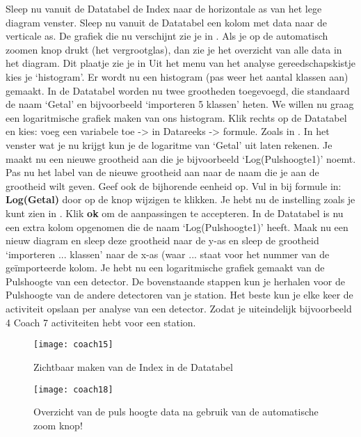 Sleep nu vanuit de Datatabel de Index naar de horizontale as van het lege diagram venster.
Sleep nu vanuit de Datatabel een kolom met data naar de verticale as.
De grafiek die nu verschijnt zie je in . Als je op de automatisch
zoomen knop drukt (het vergrootglas), dan zie je het overzicht van alle data in het
diagram. Dit plaatje zie je in 
Uit het menu van het analyse gereedschapskistje kies je `histogram'. Er wordt
nu een histogram (pas weer het aantal klassen aan) gemaakt. In de Datatabel worden
nu twee grootheden toegevoegd, die standaard de naam `Getal' en bijvoorbeeld
`importeren 5 klassen' heten.
We willen nu graag een logaritmische grafiek maken van ons histogram.
Klik rechts op de Datatabel en kies: voeg een variabele toe -> in Datareeks -> formule.
Zoals in . In het venster wat je nu krijgt kun je de logaritme
van `Getal' uit laten rekenen. Je maakt nu een nieuwe grootheid aan die je
bijvoorbeeld `Log(Pulshoogte1)' noemt.
Pas nu het label van de nieuwe grootheid aan naar de naam die je aan de grootheid
wilt geven. Geef ook de bijhorende eenheid op. Vul in bij formule in:
\textbf{Log(Getal)} door op de knop wijzigen te klikken. Je hebt nu de instelling
zoals je kunt zien in .
Klik \textbf{ok} om de aanpassingen te accepteren. In de Datatabel is nu een extra kolom opgenomen
die de naam `Log(Pulshoogte1)' heeft.
Maak nu een nieuw diagram en sleep deze grootheid naar de y-as en sleep de grootheid
`importeren ... klassen' naar de x-as (waar ... staat voor het nummer van de geïmporteerde kolom.
Je hebt nu een logaritmische grafiek gemaakt
van de Pulshoogte van een detector. De bovenstaande stappen kun je herhalen
voor de Pulshoogte van de andere detectoren van je \hisparc station.
Het beste kun je elke keer de activiteit opslaan per analyse van een detector.
Zodat je uiteindelijk bijvoorbeeld 4 Coach 7 activiteiten hebt voor een \hisparc station.

\hspace{3 mm}

\begin{figure}
    \centering
    \texttt{[image: coach15]}
    \caption{Zichtbaar maken van de Index in de Datatabel}
    \label{fig:coach15}
\end{figure}

\begin{figure}
    \centering
    \texttt{[image: coach18]}
    \caption{Overzicht van de puls hoogte data na gebruik van de automatische zoom knop!}
    \label{fig:coach18}
\end{figure}

